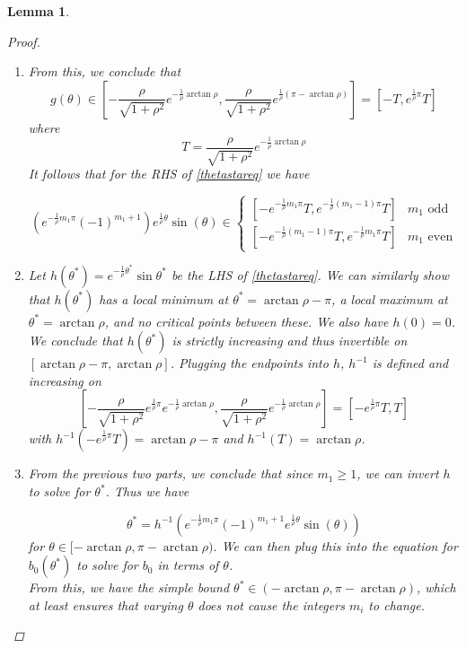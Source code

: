 \documentclass[12pt]{article}
\newtheorem{lemma}{Lemma}
\begin{document}
\begin{lemma}
\begin{proof}
\begin{enumerate}
\begin{enumerate}
		\item From this, we conclude that 
		\[
		g(\theta) \in \left[ -\frac{\rho}{\sqrt{1+\rho^2}}e^{-\frac{1}{\rho}\arctan \rho}, \frac{\rho}{\sqrt{1+\rho^2}}e^{\frac{1}{\rho}(\pi - \arctan \rho)}\right] = [-T, e^{\frac{1}{\rho}\pi} T]
		\]
		where 
		\[
		T = \frac{\rho}{\sqrt{1+\rho^2}}e^{-\frac{1}{\rho}\arctan \rho}
		\]
		It follows that for the RHS of \eqref{thetastareq} we have

		\begin{equation}\label{RHSbounds}
		\left( e^{ -\frac{1}{\rho} m_1 \pi } (-1)^{m_1 + 1} \right) e^{ \frac{1}{\rho} \theta } \sin(\theta) \in
		\begin{cases}
		[-e^{-\frac{1}{\rho}m_1 \pi} T, e^{-\frac{1}{\rho}(m_1 - 1) \pi} T] & m_1 \text{ odd}\\
		[-e^{-\frac{1}{\rho}(m_1 - 1) \pi} T, e^{-\frac{1}{\rho}m_1 \pi} T] & m_1 \text{ even}
		\end{cases}
		\end{equation}

		\item Let $h(\theta^*) = e^{ -\frac{1}{\rho}\theta^* }\sin{\theta^*}$ be the LHS of \eqref{thetastareq}. We can similarly show that $h(\theta^*)$ has a local minimum at $\theta^* = \arctan{\rho} - \pi$, a local maximum at $\theta^* = \arctan{\rho}$, and no critical points between these. We also have $h(0) = 0$. We conclude that $h(\theta^*)$ is strictly increasing and thus invertible on $[\arctan{\rho} - \pi, \arctan{\rho}]$. Plugging the endpoints into $h$, $h^{-1}$ is defined and increasing on 
		\[
		\left[ -\frac{\rho}{\sqrt{1+\rho^2}}e^{\frac{1}{\rho}\pi}e^{-\frac{1}{\rho}\arctan \rho}, \frac{\rho}{\sqrt{1+\rho^2}}e^{-\frac{1}{\rho}\arctan \rho}\right] = [-e^{\frac{1}{\rho}\pi} T , T]
		\] 
		with $h^{-1}(-e^{\frac{1}{\rho}\pi} T) = \arctan{\rho} - \pi$ and $h^{-1}(T) = \arctan \rho$. 

		\item From the previous two parts, we conclude that since $m_1 \geq 1$, we can invert $h$ to solve for $\theta^*$. Thus we have

		\[
		\theta^* = h^{-1}\left( e^{ -\frac{1}{\rho} m_1 \pi } (-1)^{m_1 + 1}  e^{ \frac{1}{\rho} \theta } \sin(\theta) \right)
		\]
		for $\theta \in [-\arctan \rho,\pi - \arctan \rho)$. We can then plug this into the equation for $b_0(\theta^*)$ to solve for $b_0$ in terms of $\theta$.\\

		From this, we have the simple bound $\theta^* \in (-\arctan \rho, \pi - \arctan \rho)$, which at least ensures that varying $\theta$ does not cause the integers $m_i$ to change.


\end{enumerate}
\end{enumerate}
\end{proof}
\end{lemma}
\end{document}
